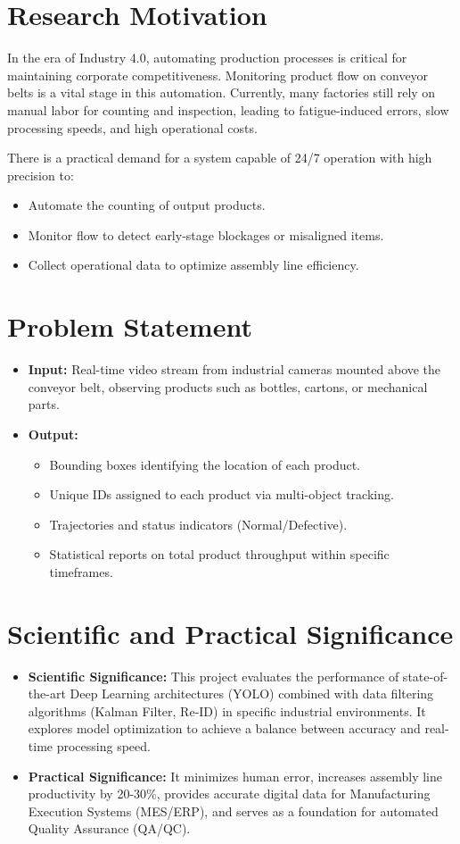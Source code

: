 \documentclass[12pt,a4paper]{report}
\begin{document}
\section{Research Motivation}
In the era of Industry 4.0, automating production processes is critical for maintaining corporate competitiveness. Monitoring product flow on conveyor belts is a vital stage in this automation. Currently, many factories still rely on manual labor for counting and inspection, leading to fatigue-induced errors, slow processing speeds, and high operational costs.

There is a practical demand for a system capable of 24/7 operation with high precision to:
\begin{itemize}
    \item Automate the counting of output products.
    \item Monitor flow to detect early-stage blockages or misaligned items.
    \item Collect operational data to optimize assembly line efficiency.
\end{itemize}

\section{Problem Statement}
\begin{itemize}
    \item \textbf{Input:} Real-time video stream from industrial cameras mounted above the conveyor belt, observing products such as bottles, cartons, or mechanical parts.
    \item \textbf{Output:} 
    \begin{itemize}
        \item Bounding boxes identifying the location of each product.
        \item Unique IDs assigned to each product via multi-object tracking.
        \item Trajectories and status indicators (Normal/Defective).
        \item Statistical reports on total product throughput within specific timeframes.
    \end{itemize}
\end{itemize}
\newpage
\section{Scientific and Practical Significance}
\begin{itemize}
    \item \textbf{Scientific Significance:} This project evaluates the performance of state-of-the-art Deep Learning architectures (YOLO) combined with data filtering algorithms (Kalman Filter, Re-ID) in specific industrial environments. It explores model optimization to achieve a balance between accuracy and real-time processing speed.
    \item \textbf{Practical Significance:} It minimizes human error, increases assembly line productivity by 20-30\%, provides accurate digital data for Manufacturing Execution Systems (MES/ERP), and serves as a foundation for automated Quality Assurance (QA/QC).
\end{itemize}
\end{document}
